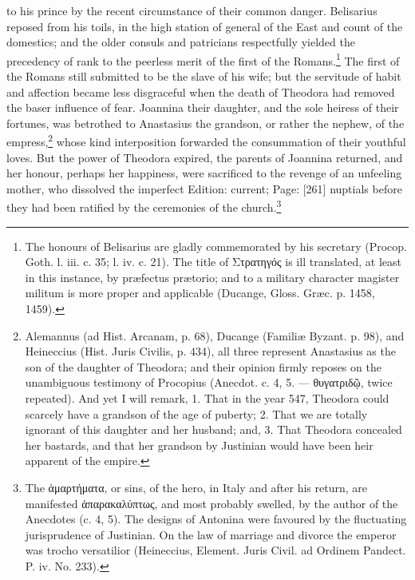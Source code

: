 to his prince by the recent circumstance of their common danger. Belisarius reposed from his toils, in the high station of general of the East and count of the domestics; and the older consuls and patricians respectfully yielded the precedency of rank to the peerless merit of the first of the Romans.\footnote{The honours of Belisarius are gladly commemorated by his secretary (Procop. Goth. l. iii. c. 35; l. iv. c. 21). The title of \textgreek{Στρατηγός} is ill translated, at least in this instance, by præfectus prætorio; and to a military character magister militum is more proper and applicable (Ducange, Gloss. Græc. p. 1458, 1459).} The first of the Romans still submitted to be the slave of his wife; but the servitude of habit and affection became less disgraceful when the death of Theodora had removed the baser influence of fear. Joannina their daughter, and the sole heiress of their fortunes, was betrothed to Anastasius the grandson, or rather the nephew, of the empress,\footnote{Alemannus (ad Hist. Arcanam, p. 68), Ducange (Familiæ Byzant. p. 98), and Heineccius (Hist. Juris Civilis, p. 434), all three represent Anastasius as the son of the daughter of Theodora; and their opinion firmly reposes on the unambiguous testimony of Procopius (Anecdot. c. 4, 5. \texthebrew{—} \textgreek{θυγατριδ\texthebrew{ῷ}}, twice repeated). And yet I will remark, 1. That in the year 547, Theodora could scarcely have a grandson of the age of puberty; 2. That we are totally ignorant of this daughter and her husband; and, 3. That Theodora concealed her bastards, and that her grandson by Justinian would have been heir apparent of the empire.} whose kind interposition forwarded the consummation of their youthful loves. But the power of Theodora expired, the parents of Joannina returned, and her honour, perhaps her happiness, were sacrificed to the revenge of an unfeeling mother, who dissolved the imperfect Edition: current; Page: [261] nuptials before they had been ratified by the ceremonies of the church.\footnote{The \textgreek{\texthebrew{ἁ}μαρτήματα}, or sins, of the hero, in Italy and after his return, are manifested \textgreek{\texthebrew{ἀ}παρακαλύπτως}, and most probably swelled, by the author of the Anecdotes (c. 4, 5). The designs of Antonina were favoured by the fluctuating jurisprudence of Justinian. On the law of marriage and divorce the emperor was trocho versatilior (Heineccius, Element. Juris Civil. ad Ordinem Pandect. P. iv. No. 233).}


